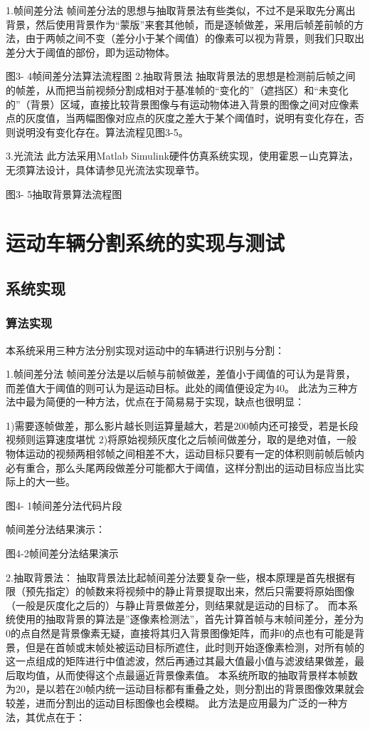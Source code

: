 \documentclass[18pt, twoside, a4paper, dvipdfm]{book}
\begin{document}
1.帧间差分法
帧间差分法的思想与抽取背景法有些类似，不过不是采取先分离出背景，然后使用背景作为“蒙版”来套其他帧，而是逐帧做差，采用后帧差前帧的方法，由于两帧之间不变（差分小于某个阈值）的像素可以视为背景，则我们只取出差分大于阈值的部份，即为运动物体。
 

图3- 4帧间差分法算法流程图
2.抽取背景法
抽取背景法的思想是检测前后帧之间的帧差，从而把当前视频分割成相对于基准帧的“变化的”（遮挡区）和“未变化的”（背景）区域，直接比较背景图像与有运动物体进入背景的图像之间对应像素点的灰度值，当两幅图像对应点的灰度之差大于某个阈值时，说明有变化存在，否则说明没有变化存在。算法流程见图3-5。

3.光流法
	此方法采用Matlab Simulink硬件仿真系统实现，使用霍恩－山克算法，无须算法设计，具体请参见光流法实现章节。
 

图3- 5抽取背景算法流程图


\chapter{运动车辆分割系统的实现与测试}
\section{系统实现}
\subsection{算法实现}
本系统采用三种方法分别实现对运动中的车辆进行识别与分割：

1.帧间差分法
帧间差分法是以后帧与前帧做差，差值小于阈值的可认为是背景，而差值大于阈值的则可认为是运动目标。此处的阈值便设定为40。
此法为三种方法中最为简便的一种方法，优点在于简易易于实现，缺点也很明显：

1)需要逐帧做差，那么影片越长则运算量越大，若是200帧内还可接受，若是长段视频则运算速度堪忧
2)将原始视频灰度化之后帧间做差分，取的是绝对值，一般物体运动的视频两相邻帧之间相差不大，运动目标只要有一定的体积则前帧后帧内必有重合，那么头尾两段做差分可能都大于阈值，这样分割出的运动目标应当比实际上的大一些。
 

图4- 1帧间差分法代码片段

帧间差分法结果演示：
 

图4-2帧间差分法结果演示

2.抽取背景法：
抽取背景法比起帧间差分法要复杂一些，根本原理是首先根据有限（预先指定）的帧数来将视频中的静止背景提取出来，然后只需要将原始图像（一般是灰度化之后的）与静止背景做差分，则结果就是运动的目标了。
而本系统使用的抽取背景的算法是”逐像素检测法”，首先计算首帧与末帧间差分，差分为0的点自然是背景像素无疑，直接将其归入背景图像矩阵，而非0的点也有可能是背景，但是在首帧或末帧处被运动目标所遮住，此时则开始逐像素检测，对所有帧的这一点组成的矩阵进行中值滤波，然后再通过其最大值最小值与滤波结果做差，最后取均值，从而使得这个点最逼近背景像素值。
本系统所取的抽取背景样本帧数为20，是以若在20帧内统一运动目标都有重叠之处，则分割出的背景图像效果就会较差，进而分割出的运动目标图像也会模糊。
此方法是应用最为广泛的一种方法，其优点在于：
\end{document}
